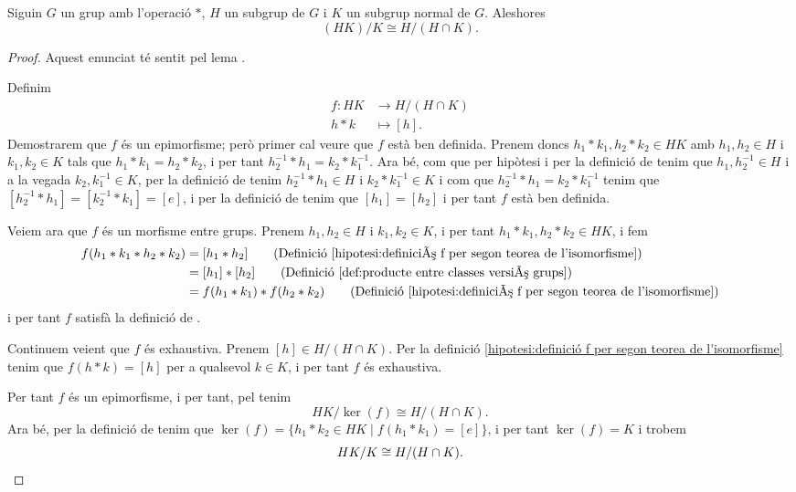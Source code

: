 \documentclass[../Apunts.tex]{subfiles}
\begin{document}
	\begin{theorem}
		\label{thm:Segon Teorema de l'isomorfisme entre grups}
		Siguin \(G\) un grup amb l'operació \(\ast\), \(H\) un subgrup de \(G\) i \(K\) un subgrup normal de \(G\). Aleshores
		\[(HK)/K\cong H/(H\cap K).\]
		\begin{proof}
			Aquest enunciat té sentit pel lema .
			
			Definim
			\begin{align}\label{hipotesi:definició f per segon teorea de l'isomorfisme}
			f\colon HK&\longrightarrow H/(H\cap K)\\
			h\ast k&\longmapsto [h].\nonumber
			\end{align}
			Demostrarem que \(f\) és un epimorfisme; però primer cal veure que \(f\) està ben definida. Prenem doncs \(h_{1}\ast k_{1},h_{2}\ast k_{2}\in HK\) amb \(h_{1},h_{2}\in H\) i \(k_{1},k_{2}\in K\) tals que \(h_{1}\ast k_{1}=h_{2}\ast k_{2}\), i per tant \(h_{2}^{-1}\ast h_{1}=k_{2}\ast k_{1}^{-1}\). Ara bé, com que per hipòtesi i per la definició de  tenim que \(h_{1},h_{2}^{-1}\in H\) i a la vegada \(k_{2},k_{1}^{-1}\in K\), per la definició de  tenim \(h_{2}^{-1}\ast h_{1}\in H\) i \(k_{2}\ast k_{1}^{-1}\in K\) i com que \(h_{2}^{-1}\ast h_{1}=k_{2}\ast k_{1}^{-1}\) tenim que \([h_{2}^{-1}\ast h_{1}]=[k_{2}^{-1}\ast k_{1}]=[e]\), i per la definició de  %
			tenim que \([h_{1}]=[h_{2}]\) i per tant \(f\) està ben definida.
			
			Veiem ara que \(f\) és un morfisme entre grups. Prenem \(h_{1},h_{2}\in H\) i \(k_{1},k_{2}\in K\), i per tant \(h_{1}\ast k_{1},h_{2}\ast k_{2}\in HK\), i fem
			\begin{align*}
			f(h_{1}\ast k_{1}\ast h_{2}\ast k_{2})&=[h_{1}\ast h_{2}]\tag{Definició \eqref{hipotesi:definició f per segon teorea de l'isomorfisme}}\\
			&=[h_{1}]\ast[h_{2}]\tag{Definició \eqref{def:producte entre classes versió grups}}\\
			&=f(h_{1}\ast k_{1})\ast f(h_{2}\ast k_{2})\tag{Definició \eqref{hipotesi:definició f per segon teorea de l'isomorfisme}}
			\end{align*}
			i per tant \(f\) satisfà la definició de .
			
			Continuem veient que \(f\) és exhaustiva. Prenem \([h]\in H/(H\cap K)\). Per la definició \eqref{hipotesi:definició f per segon teorea de l'isomorfisme} tenim que \(f(h\ast k)=[h]\) per a qualsevol \(k\in K\), i per tant \(f\) és exhaustiva.
			
			Per tant \(f\) és un epimorfisme, i per tant, pel  tenim
			\[HK/\ker(f)\cong H/(H\cap K).\]
			Ara bé, per la definició de  tenim que \(\ker(f)=\{h_{1}\ast k_{2}\in HK\mid f(h_{1}\ast k_{1})=[e]\}\), i per tant \(\ker(f)=K\) i trobem
			\[HK/K\cong H/(H\cap K).\qedhere\]
		\end{proof}
	\end{theorem}
\end{document}
